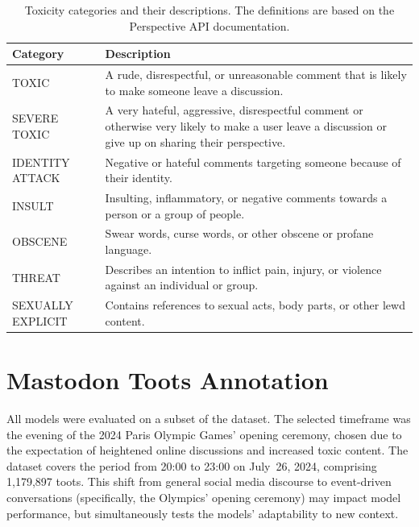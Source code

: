 \begin{table}[tb]
    \centering\small
    \renewcommand{\arraystretch}{1.3}
    \begin{tabularx}{\textwidth}{lX}
        \toprule
        \textbf{Category} & \textbf{Description} \\
        \midrule
        TOXIC & A rude, disrespectful, or unreasonable comment that is likely to make someone leave a discussion. \\
        SEVERE TOXIC & A very hateful, aggressive, disrespectful comment or otherwise very likely to make a user leave a discussion or give up on sharing their perspective. \\
        IDENTITY ATTACK & Negative or hateful comments targeting someone because of their identity. \\
        INSULT & Insulting, inflammatory, or negative comments towards a person or a group of people. \\
        OBSCENE & Swear words, curse words, or other obscene or profane language. \\
        THREAT & Describes an intention to inflict pain, injury, or violence against an individual or group. \\
        SEXUALLY EXPLICIT & Contains references to sexual acts, body parts, or other lewd content. \\
        \bottomrule
    \end{tabularx}
    \caption[perspectiveapi]{Toxicity categories and their descriptions. The definitions are based on the Perspective API documentation\footnotemark.}
    \label{toxicity-categories}
\end{table}

\section{Mastodon Toots Annotation} \label{annotation}
All models were evaluated on a subset of the dataset. The selected timeframe was the evening of the 2024 Paris Olympic Games' opening ceremony, chosen due to the expectation of heightened online discussions and increased toxic content. The dataset covers the period from 20:00 to 23:00 on July~26, 2024, comprising 1,179,897 toots. This shift from general social media discourse to event-driven conversations (specifically, the Olympics' opening ceremony) may impact model performance, but simultaneously tests the models' adaptability to new context.

